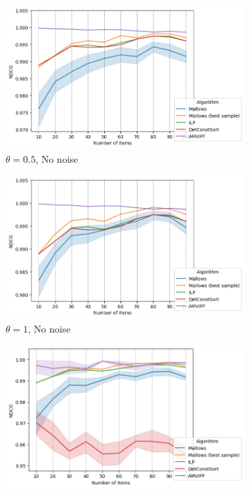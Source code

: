 \begin{figure}
     \centering
     \begin{subfigure}{0.4\textwidth}
         \centering
         \includegraphics[width=\textwidth]{resources/00/ndcg.png}
         \caption{$\theta = 0.5$, No noise}
         \label{fig:00ndcg}
     \end{subfigure}\quad
     \begin{subfigure}[b]{0.4\textwidth}
         \centering
         \includegraphics[width=\textwidth]{resources/10/ndcg.png}
         \caption{$\theta = 1$, No noise}
         \label{fig:10ndcg}
     \end{subfigure}\quad
     \begin{subfigure}[b]{0.4\textwidth}
         \centering
         \includegraphics[width=\textwidth]{resources/01/ndcg.png}

\end{subfigure}
\end{figure}
